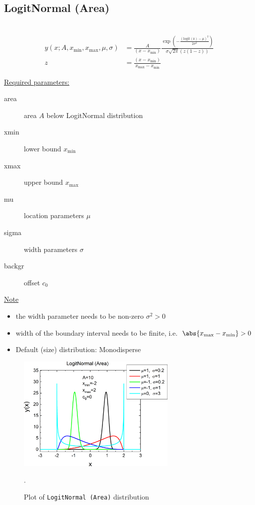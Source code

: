 \clearpage
\subsection{LogitNormal (Area)} ~\\
\label{sec:LogitArea}
\begin{align}
y(x; A,x_\mathrm{min},x_\mathrm{max},\mu,\sigma) &= \frac{A}{\left(x-x_\mathrm{min}\right)} \frac{\exp\left(-\frac{\left(\operatorname{logit(z)}-\mu\right)^2}{2\sigma^2}\right)} {\sigma\sqrt{2\pi}\left(z(1-z)\right)} \\
z &= \frac{\left(x-x_\mathrm{min}\right)}{x_\mathrm{max}-x_\mathrm{min}}
\end{align}

\uline{Required parameters:}
\begin{description}
    \item[area] area $A$ below LogitNormal distribution
    \item[xmin] lower bound $x_\mathrm{min}$
    \item[xmax] upper bound $x_\mathrm{max}$
    \item[mu] location parameters $\mu$
    \item[sigma] width parameters $\sigma$
    \item[backgr] offset $c_0$
\end{description}

\uline{Note}
\begin{itemize}
  \item the width parameter needs to be non-zero $\sigma^2 > 0$
  \item width of the boundary interval needs to be finite, i.e.\ $\abs{x_\mathrm{max}-x_\mathrm{min}}>0$
  \item Default (size) distribution: Monodisperse
\end{itemize}

\begin{figure}[htb]
\begin{center}
\includegraphics[width=0.6824\textwidth]{../images/peaks/LogitNormal/LogitArea.png}
\end{center}
\caption{Plot of \texttt{LogitNormal (Area)} distribution}.
\label{fig:LogitArea}
\end{figure}

